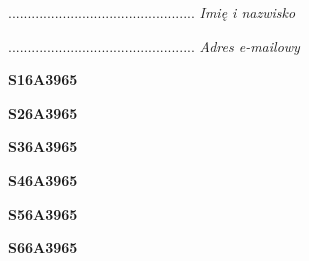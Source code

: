\begin{turn}{90}\begin{minipage}{\linewidth} \vspace{20mm} ................................................  \textit{Imię i nazwisko}\end{minipage}\end{turn}

\begin{turn}{90}\begin{minipage}{\linewidth} \vspace{20mm} ................................................  \textit{Adres e-mailowy}\end{minipage}\end{turn}

\begin{turn}{90}\huge \begin{minipage}{\linewidth} \vspace{10mm}\textbf{S16A3965}\end{minipage}\end{turn}

\begin{turn}{90}\huge \begin{minipage}{\linewidth} \vspace{10mm}\textbf{S26A3965}\end{minipage}\end{turn}

\begin{turn}{90}\huge \begin{minipage}{\linewidth} \vspace{10mm}\textbf{S36A3965}\end{minipage}\end{turn}

\begin{turn}{90}\huge \begin{minipage}{\linewidth} \vspace{10mm}\textbf{S46A3965}\end{minipage}\end{turn}

\begin{turn}{90}\huge \begin{minipage}{\linewidth} \vspace{10mm}\textbf{S56A3965}\end{minipage}\end{turn}

\begin{turn}{90}\huge \begin{minipage}{\linewidth} \vspace{10mm}\textbf{S66A3965}\end{minipage}\end{turn}

